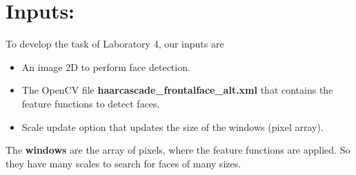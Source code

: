 \section{Inputs:}
To develop the task of Laboratory 4, our inputs are 
\begin{itemize}
	\item An image 2D to perform face detection.
	\item The OpenCV file \textbf{haarcascade\_frontalface\_alt.xml} that contains the feature functions to detect faces.
	\item Scale update option that updates the size of the windows (pixel array).
\end{itemize}
The \textbf{windows} are the array of pixels, where the feature functions are applied. So they have many scales to search for faces of many sizes.